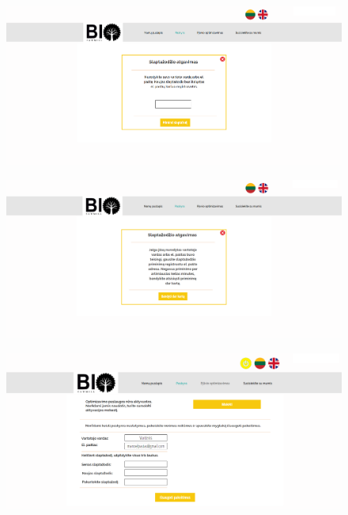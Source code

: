 \documentclass[a4paper,12pt]{article}
\begin{document}
\begin{figure}[!tph]
\hspace{-3cm}
\centering
\includegraphics[scale=0.5]{interfeisai/paskyrosPuslapisPamirstasSlaptazodis}
\label{fig:verticalcell}
\end{figure}

\begin{figure}[!tph]
\hspace{-3cm}
\centering
\includegraphics[scale=0.5]{interfeisai/paskyrosPuslapisPamirstasSlaptazodis2}
\label{fig:verticalcell}
\end{figure}


\begin{figure}[!tph]
\hspace{-3cm}
\centering
\includegraphics[scale=0.5]{interfeisai/paskyrosPuslapisVartotojasNeapmoketas}
\label{fig:verticalcell}
\end{figure}
\end{document}
